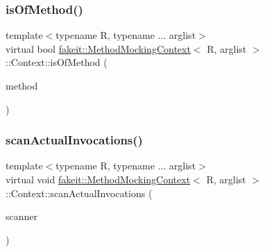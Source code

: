 \mbox{\label{structfakeit_1_1MethodMockingContext_1_1Context_a126835068d4a7bcbf01f47080e690510}} 
\subsubsection{\texorpdfstring{isOfMethod()}{isOfMethod()}\hspace{0.1cm}{\footnotesize\ttfamily [9/9]}}
{\footnotesize\ttfamily template$<$typename R, typename ... arglist$>$ \\
virtual bool \mbox{\hyperlink{classfakeit_1_1MethodMockingContext}{fakeit\+::\+Method\+Mocking\+Context}}$<$ R, arglist $>$\+::Context\+::is\+Of\+Method (\begin{DoxyParamCaption}\item[{\mbox{\hyperlink{structfakeit_1_1MethodInfo}{Method\+Info}} \&}]{method }\end{DoxyParamCaption})\hspace{0.3cm}{\ttfamily [pure virtual]}}

\mbox{\label{structfakeit_1_1MethodMockingContext_1_1Context_a89b30ea54bcf5e55c19696f77ad8423b}} 
\subsubsection{\texorpdfstring{scanActualInvocations()}{scanActualInvocations()}\hspace{0.1cm}{\footnotesize\ttfamily [1/9]}}
{\footnotesize\ttfamily template$<$typename R, typename ... arglist$>$ \\
virtual void \mbox{\hyperlink{classfakeit_1_1MethodMockingContext}{fakeit\+::\+Method\+Mocking\+Context}}$<$ R, arglist $>$\+::Context\+::scan\+Actual\+Invocations (\begin{DoxyParamCaption}\item[{const std\+::function$<$ void(\mbox{\hyperlink{structfakeit_1_1ActualInvocation}{Actual\+Invocation}}$<$ arglist... $>$ \&)$>$ \&}]{scanner }\end{DoxyParamCaption})\hspace{0.3cm}{\ttfamily [pure virtual]}}

